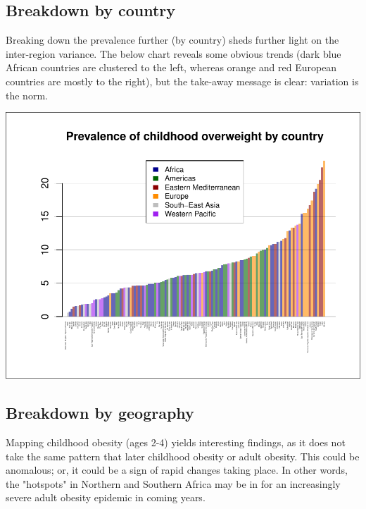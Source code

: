 \documentclass[11pt]{article}
\begin{document}
\begin{multicols}{2}
\subsection*{Breakdown by country}

Breaking down the prevalence further (by country) sheds further light on the inter-region variance.  The below chart reveals some obvious trends (dark blue African countries are clustered to the left, whereas orange and red European countries are mostly to the right), but the take-away message is clear: variation is the norm. \\

\begin{center}
\includegraphics{global_variance-006}
\end{center}

\subsection*{Breakdown by geography}
Mapping childhood obesity (ages 2-4) yields interesting findings, as it does not take the same pattern that later childhood obesity or adult obesity.  This could be anomalous; or, it could be a sign of rapid changes taking place.  In other words, the "hotspots" in Northern and Southern Africa may be in for an increasingly severe adult obesity epidemic in coming years.


\end{multicols}
\end{document}
